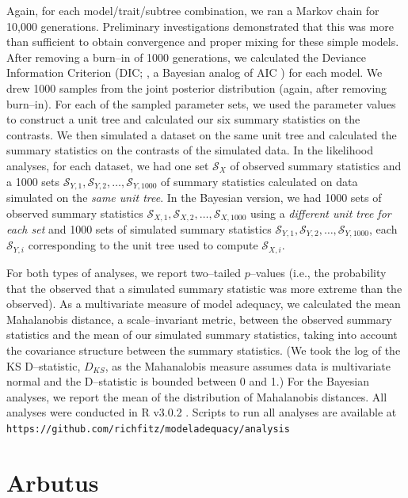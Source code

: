 \documentclass[a4paper,12pt]{article}
\begin{document}
Again, for each model/trait/subtree combination, we ran a Markov chain for 10,000 generations. Preliminary investigations demonstrated that this was more than sufficient to obtain convergence and proper mixing for these simple models. After removing a burn--in of 1000 generations, we calculated the Deviance Information Criterion (DIC; \citep{dic}, a Bayesian analog of AIC \citep{Gelman2013}) for each model. We drew 1000 samples from the joint posterior distribution (again, after removing burn--in). For each of the sampled parameter sets, we used the parameter values to construct a unit tree and calculated our six summary statistics on the contrasts. We then simulated a dataset on the same unit tree and calculated the summary statistics on the contrasts of the simulated data. In the likelihood analyses, for each dataset, we had one set $\mathcal{S}_X$ of observed summary statistics and a 1000 sets $\mathcal{S}_{Y,1}, \mathcal{S}_{Y,2}, \ldots, \mathcal{S}_{Y,1000}$ of summary statistics calculated on data simulated on the \emph{same unit tree}. In the Bayesian version, we had 1000 sets of observed summary statistics $\mathcal{S}_{X,1}, \mathcal{S}_{X,2}, \ldots, \mathcal{S}_{X,1000}$ using a \emph{different unit tree for each set} and 1000 sets of simulated summary statistics $\mathcal{S}_{Y,1}, \mathcal{S}_{Y,2}, \ldots, \mathcal{S}_{Y,1000}$, each $\mathcal{S}_{Y,i}$ corresponding to the unit tree used to compute $\mathcal{S}_{X,i}$.
 
For both types of analyses, we report two--tailed $p$--values (i.e., the probability that the observed that a simulated summary statistic was more extreme than the observed). As a multivariate measure of model adequacy, we calculated the mean Mahalanobis distance, a scale--invariant metric, between the observed summary statistics and the mean of our simulated summary statistics, taking into account the covariance structure between the summary statistics. (We took the log of the KS D--statistic, $D_{KS}$, as the Mahanalobis measure assumes data is multivariate normal and the D--statistic is bounded between 0 and 1.) For the Bayesian analyses, we report the mean of the distribution of Mahalanobis distances. All analyses were conducted in R v3.0.2 \citep{R}. Scripts to run all analyses are available at \texttt{https://github.com/richfitz/modeladequacy/analysis}

\section{Arbutus}
\end{document}
